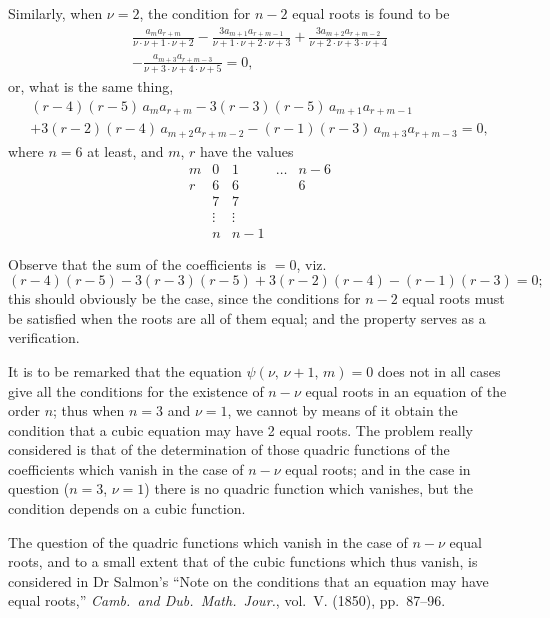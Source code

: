 \documentclass[11pt,a4paper]{article}
\theoremstyle{cayley}
\begin{document}
Similarly, when $\nu=2$, the condition for $n-2$ equal roots is found to be
\begin{multline*}
\frac{a_{m}a_{r+m}}{\nu \cdot \nu+1 \cdot \nu+2} - \frac{3a_{m+1}a_{r+m-1}}{\nu+1 \cdot \nu+2 \cdot \nu+3} + \frac{3a_{m+2}a_{r+m-2}}{\nu+2 \cdot \nu+3 \cdot \nu+4} \\
- \frac{a_{m+3}a_{r+m-3}}{\nu+3 \cdot \nu+4 \cdot \nu+5} = 0,
\end{multline*}
or, what is the same thing,
\begin{multline*}
(r-4)(r-5)\,a_{m}a_{r+m} - 3(r-3)(r-5)\,a_{m+1}a_{r+m-1} \\
+ 3(r-2)(r-4)\,a_{m+2}a_{r+m-2} - (r-1)(r-3)\,a_{m+3}a_{r+m-3} = 0,
\end{multline*}
where $n=6$ at least, and $m$, $r$ have the values
\[
\begin{array}{c|cccc}
m & 0 & 1 & \dots & n-6 \\ \hline
r & 6 & 6 & & 6 \\
  & 7 & 7 & & \\
  & \vdots & \vdots & & \\
  & n & n-1 & &
\end{array}
\]

Observe that the sum of the coefficients is $=0$, viz.
\[
(r-4)(r-5) - 3(r-3)(r-5) + 3(r-2)(r-4) - (r-1)(r-3) = 0;
\]
this should obviously be the case, since the conditions for $n-2$ equal roots must be satisfied when the roots are all of them equal; and the property serves as a verification.

It is to be remarked that the equation $\psi(\nu,\, \nu+1,\, m) = 0$ does not in all cases give all the conditions for the existence of $n-\nu$ equal roots in an equation of the order $n$; thus when $n=3$ and $\nu=1$, we cannot by means of it obtain the condition that a cubic equation may have 2 equal roots. The problem really considered is that of the determination of those quadric functions of the coefficients which vanish in the case of $n-\nu$ equal roots; and in the case in question ($n=3$, $\nu=1$) there is no quadric function which vanishes, but the condition depends on a cubic function.

The question of the quadric functions which vanish in the case of $n-\nu$ equal roots, and to a small extent that of the cubic functions which thus vanish, is considered in Dr Salmon's ``Note on the conditions that an equation may have equal roots,'' \textit{Camb.\ and Dub.\ Math.\ Jour.}, vol.~V. (1850), pp.~87--96.

\newpage
\end{document}
